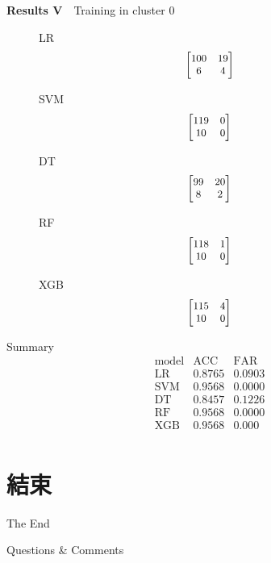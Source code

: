 \documentclass[12pt,aspectratio=43]{beamer}
\begin{document}
\begin{frame}{\textbf{Results V}　{Training in cluster 0}}
\linespread{0.9}
{\small
\begin{figure}[h]
\centering

\begin{minipage}{0.28\linewidth}
\raggedright
{\small LR}
$$
\small
\begin{bmatrix}
100 & 19 \\
6  & 4
\end{bmatrix}
$$
\end{minipage}
\begin{minipage}{0.28\linewidth}
\raggedright
{\small SVM}
$$
\small
\begin{bmatrix}
119 & 0 \\
10  & 0
\end{bmatrix}
$$
\end{minipage}
\begin{minipage}{0.28\linewidth}
\raggedright
{\small DT}
$$
\small
\begin{bmatrix}
99 & 20 \\
8  & 2
\end{bmatrix}
$$
\end{minipage}

\vspace{0.5em}

\begin{minipage}{0.28\linewidth}
\raggedright
{\small RF}
$$
\small
\begin{bmatrix}
118 & 1 \\
10  & 0
\end{bmatrix}
$$
\end{minipage}
\begin{minipage}{0.28\linewidth}
\raggedright
{\small XGB}
$$
\small
\begin{bmatrix}
115 & 4 \\
10  & 0
\end{bmatrix}
$$
\end{minipage}

\end{figure}
}

{\small
Summary
$$
\begin{array}{l|cc}
\text{model} & \text{ACC} & \text{FAR} \\
\hline
\text{LR} & 0.8765 & 0.0903 \\
\text{SVM} & 0.9568 & 0.0000 \\
\text{DT} & 0.8457 & 0.1226\\
\text{RF} & 0.9568 & 0.0000 \\
\text{XGB} & 0.9568 & 0.000 \\
\end{array}
$$
}

\end{frame}

\section*{結束}

\begin{frame}[plain] %
	\begin{center}
		{\Huge The End}
		\bigskip\bigskip 

		{\LARGE Questions  \&  Comments}
	\end{center}
\end{frame}
\end{document}
